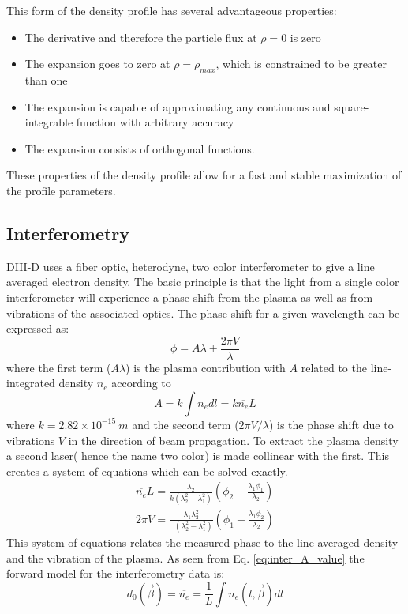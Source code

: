 \documentclass[12pt]{article}
\numberwithin{equation}{section}
\begin{document}
This form of the density profile has several advantageous properties:
\begin{itemize}
	\item The derivative and therefore the particle flux at $\rho = 0$ is zero
	\item The expansion goes to zero at $\rho = \rho_{max}$, which is constrained to be greater than one  
	\item The expansion is capable of approximating any continuous and square-integrable function with arbitrary accuracy
	\item The expansion consists of orthogonal functions.
\end{itemize}
These properties of the density profile allow for a fast and stable 
maximization of the profile parameters. 
\subsection{Interferometry}
DIII-D uses a fiber optic, heterodyne, two color interferometer to 
give a line averaged electron density.\cite{van2006fiber} The basic 
principle is that the light from a single color interferometer will 
experience a phase shift from the plasma as well as from vibrations of 
the associated optics. The phase shift for a given wavelength can be 
expressed as:
\begin{equation} \label{eq:inter_phase}
	\phi = A \lambda + \frac{2\pi V}{\lambda}
\end{equation}
where the first term ($A\lambda$) is the plasma contribution with $A$ 
related to the line-integrated density $n_e$ according to
\begin{equation} \label{eq:inter_A_value}
	A = k \int n_e dl = k\overline{n_e}L
\end{equation}
where $k=2.82 \times 10^{-15} \:m$ and the second term ($2\pi V/
\lambda$) is the phase shift due to vibrations $V$ in the direction 
of beam propagation. To extract the plasma density a second laser( 
hence the name two color) is made collinear with the first. This 
creates a system of equations which can be solved exactly.
\begin{align} \label{eq:inter_system}
	\overline{n_e} L = \frac{\lambda_2}{k(\lambda_2^2 - \lambda_1^2)}\left( \phi_2 - \frac{\lambda_1 \phi_1}{\lambda_2}\right) \\ 
	2\pi V = \frac{\lambda_1 \lambda_2^2}{\:\:\,(\lambda_2^2 - \lambda_1^2)}\left( \phi_1 - \frac{\lambda_1 \phi_2}{\lambda_2}\right)
\end{align}
This system of equations relates the measured phase to the line-averaged density and the vibration of the plasma. 
As seen from Eq. \ref{eq:inter_A_value} the forward model for the 
interferometry data is:
\begin{equation} \label{eq:inter_model}
	d_0(\vec{\beta})=\overline{n_e} = \frac{1}{L} \int n_e(l,\vec{\beta}) dl
\end{equation}
\end{document}
